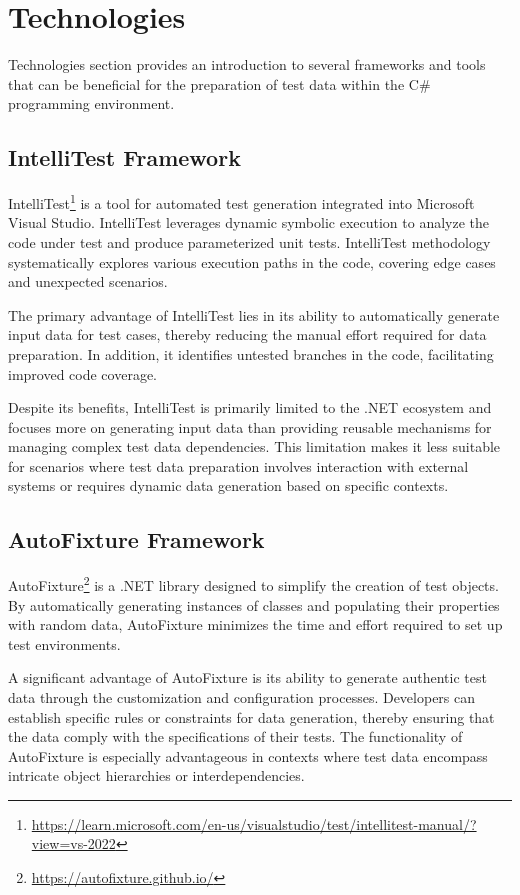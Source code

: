 \section{Technologies}
Technologies section provides an introduction to several frameworks and tools that can be beneficial for the preparation of test data within the C\# programming environment.

\subsection{IntelliTest Framework}
IntelliTest\footnote{\href{https://learn.microsoft.com/en-us/visualstudio/test/intellitest-manual/?view=vs-2022}{https://learn.microsoft.com/en-us/visualstudio/test/intellitest-manual/?view=vs-2022}} is a tool for automated test generation integrated into Microsoft Visual Studio. IntelliTest leverages dynamic symbolic execution to analyze the code under test and produce parameterized unit tests. IntelliTest methodology systematically explores various execution paths in the code, covering edge cases and unexpected scenarios.

The primary advantage of IntelliTest lies in its ability to automatically generate input data for test cases, thereby reducing the manual effort required for data preparation. In addition, it identifies untested branches in the code, facilitating improved code coverage.

Despite its benefits, IntelliTest is primarily limited to the .NET ecosystem and focuses more on generating input data than providing reusable mechanisms for managing complex test data dependencies. This limitation makes it less suitable for scenarios where test data preparation involves interaction with external systems or requires dynamic data generation based on specific contexts.

\subsection{AutoFixture Framework}

AutoFixture\footnote{\href{https://autofixture.github.io/}{https://autofixture.github.io/}} is a .NET library designed to simplify the creation of test objects. By automatically generating instances of classes and populating their properties with random data, AutoFixture minimizes the time and effort required to set up test environments.

A significant advantage of AutoFixture is its ability to generate authentic test data through the customization and configuration processes. Developers can establish specific rules or constraints for data generation, thereby ensuring that the data comply with the specifications of their tests. The functionality of AutoFixture is especially advantageous in contexts where test data encompass intricate object hierarchies or interdependencies.

